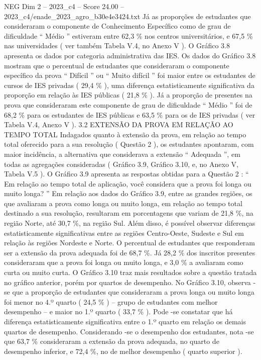 \begin{textsample}{NEG Dim 2 – 2023\_c4 – Score 24.00 – 2023\_c4/enade\_2023\_agro\_b30e4e3424.txt}
Já as proporções de estudantes que consideraram o componente de Conhecimento Específico como de grau de dificuldade “ Médio ” estiveram entre 62,3 \% nos centros universitários, e 67,5 \% nas universidades ( ver também Tabela V.4, no Anexo V ).
O Gráfico 3.8 apresenta os dados por categoria administrativa das IES.
Os dados do Gráfico 3.8 mostram que o percentual de estudantes que consideraram o componente específico da prova “ Difícil ” ou “ Muito difícil ” foi maior entre os estudantes de cursos de IES privadas ( 29,4 \% ), uma diferença estatisticamente significativa da proporção em relação às IES públicas ( 21,8 \% ).
Já a proporção de presentes na prova que consideraram este componente de grau de dificuldade “ Médio ” foi de 68,2 \% para os estudantes de IES públicas e 63,5 \% para os de IES privadas ( ver Tabela V.4, Anexo V ). 3.2 EXTENSÃO DA PROVA EM RELAÇÃO AO TEMPO TOTAL Indagados quanto à extensão da prova, em relação ao tempo total oferecido para a sua resolução ( Questão 2 ), os estudantes apontaram, com maior incidência, a alternativa que considerava a extensão “ Adequada ”, em todas as agregações consideradas ( Gráfico 3.9, Gráfico 3.10, e, no Anexo V, Tabela V.5 ).
O Gráfico 3.9 apresenta as respostas obtidas para a Questão 2 : “ Em relação ao tempo total de aplicação, você considera que a prova foi longa ou muito longa? ” Em relação aos dados do Gráfico 3.9, entre as grandes regiões, os que avaliaram a prova como longa ou muito longa, em relação ao tempo total destinado a sua resolução, resultaram em porcentagens que variam de 21,8 \%, na região Norte, até 30,7 \%, na região Sul.
Além disso, é possível observar diferenças estatisticamente significativas entre as regiões Centro-Oeste, Sudeste e Sul em relação às regiões Nordeste e Norte.
O percentual de estudantes que responderam ser a extensão da prova adequada foi de 68,7 \%.
Já 28,2 \% dos inscritos presentes consideraram que a prova foi longa ou muito longa, e 3,0 \% a avaliaram como curta ou muito curta.
O Gráfico 3.10 traz mais resultados sobre a questão tratada no gráfico anterior, porém por quartos de desempenho.
No Gráfico 3.10, observa -se que a proporção de estudantes que consideraram a prova longa ou muito longa foi menor no 4.º quarto ( 24,5 \% ) – grupo de estudantes com melhor desempenho – e maior no 1.º quarto ( 33,7 \% ).
Pode -se constatar que há diferença estatisticamente significativa entre o 1.º quarto em relação os demais quartos de desempenho.
Considerando -se o desempenho dos estudantes, nota -se que 63,7 \% consideraram a extensão da prova adequada, no quarto de desempenho inferior, e 72,4 \%, no de melhor desempenho ( quarto superior ).

\end{textsample}

